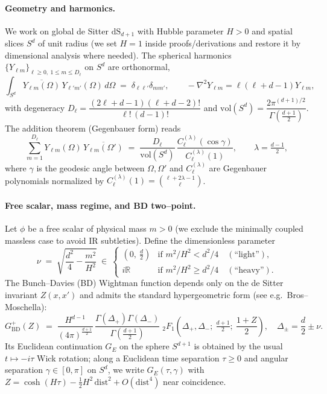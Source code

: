 \documentclass[10pt]{article}
\theoremstyle{definition}
\theoremstyle{plain}
\begin{document}
\paragraph{Geometry and harmonics.}\label{par:uom-main-235}
We work on global de Sitter $\mathrm{dS}_{d+1}$ with Hubble parameter $H>0$ and
spatial slices $S^d$ of unit radius (we set $H=1$ inside proofs/derivations and
restore it by dimensional analysis where needed). The spherical harmonics
$\{Y_{\ell m}\}_{\ell\ge0,\ 1\le m\le D_\ell}$ on $S^d$ are orthonormal,
\[
\int_{S^d}\! \overline{Y_{\ell m}(\Omega)}\,Y_{\ell' m'}(\Omega)\,d\Omega
\;=\;\delta_{\ell\ell'}\delta_{mm'},
\qquad
-\nabla^2 Y_{\ell m}=\ell(\ell+d-1)Y_{\ell m},
\]
with degeneracy $D_\ell=\dfrac{(2\ell+d-1)(\ell+d-2)!}{\ell!\,(d-1)!}$ and
$\mathrm{vol}(S^d)=\dfrac{2\pi^{(d+1)/2}}{\Gamma(\frac{d+1}{2})}$.
The addition theorem (Gegenbauer form) reads
\[
\sum_{m=1}^{D_\ell} Y_{\ell m}(\Omega)\,\overline{Y_{\ell m}(\Omega')}
\;=\;\frac{D_\ell}{\mathrm{vol}(S^d)}\,
\frac{C_\ell^{(\lambda)}(\cos\gamma)}{C_\ell^{(\lambda)}(1)},
\qquad \lambda=\tfrac{d-1}{2},
\]
where $\gamma$ is the geodesic angle between $\Omega,\Omega'$ and
$C_\ell^{(\lambda)}$ are Gegenbauer polynomials normalized by
$C_\ell^{(\lambda)}(1)=\binom{\ell+2\lambda-1}{\ell}$.

\paragraph{Free scalar, mass regime, and BD two–point.}\label{par:uom-main-236}
Let $\phi$ be a free scalar of physical mass $m>0$ (we exclude the minimally
coupled massless case to avoid IR subtleties). Define the dimensionless
parameter
\[
\nu \;=\; \sqrt{\frac{d^2}{4}-\frac{m^2}{H^2}}\ \in\ 
\begin{cases}
(0,\ \tfrac{d}{2}) &\text{if } m^2/H^2<d^2/4 \quad(\text{``light''}),\\[2pt]
i\mathbb R &\text{if } m^2/H^2\ge d^2/4 \quad(\text{``heavy''}).
\end{cases}
\]
The Bunch–Davies (BD) Wightman function depends only on the de Sitter invariant
$Z(x,x')$ and admits the standard hypergeometric form (see e.g.\ Bros–Moschella):
\[
G^+_{\mathrm{BD}}(Z)\;=\;\frac{H^{d-1}}{(4\pi)^{\frac{d+1}{2}}}\,
\frac{\Gamma(\Delta_+)\Gamma(\Delta_-)}{\Gamma(\tfrac{d+1}{2})}\;
{}_2F_1\!\left(\Delta_+,\Delta_-;\ \tfrac{d+1}{2};\ \frac{1+Z}{2}\right),
\quad \Delta_\pm=\frac{d}{2}\pm \nu.
\]
Its Euclidean continuation $G_E$ on the sphere $S^{d+1}$ is obtained by the
usual $t\mapsto -i\tau$ Wick rotation; along a Euclidean time separation
$\tau\ge0$ and angular separation $\gamma\in[0,\pi]$ on $S^d$, we write
$G_E(\tau,\gamma)$ with $Z=\cosh(H\tau)-\tfrac{1}{2}H^2\,\mathrm{dist}^2+O(\mathrm{dist}^4)$
near coincidence.
\end{document}
